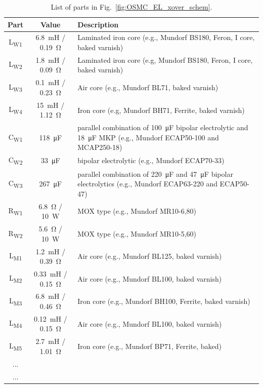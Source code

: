\documentclass[12pt,a4paper]{article}
\providecommand{\figr}[1]{Fig.~\ref{fig:#1}}
\providecommand{\tablabel}[1]{\label{tab:#1}}
\providecommand{\inductor}[1]{L\textsubscript{#1}}
\providecommand{\capacitor}[1]{C\textsubscript{#1}}
\providecommand{\resistor}[1]{R\textsubscript{#1}}
\begin{document}
\begin{table}[tb]

\centering
\caption{List of parts in \figr{OSMC_EL_xover_schem}.}
\tablabel{tab:OSMC_EL_xover_parts}
\begin{tabular}{ccp{}} 
\toprule
Part & Value & Description\\ 
\midrule 

\inductor{W1}	& \SI{6.8}{mH} / \SI{0.19}{\ohm}	& Laminated iron core (e.g., Mundorf BS180, Feron, I core, baked varnish)\\
\inductor{W2}	& \SI{1.8}{mH} / \SI{0.09}{\ohm}	& Laminated iron core (e.g, Mundorf BS180, Feron, I core, baked varnish)\\
\inductor{W3}	& \SI{0.1}{mH} / \SI{0.23}{\ohm}	& Air core (e.g., Mundorf BL71, baked varnish)\\
\inductor{W4}	& \SI{15}{mH}  / \SI{1.12}{\ohm}	& Iron core (e.g, Mundorf BH71, Ferrite, baked varnish)\\
\capacitor{W1}	& \SI{118}{\micro F}			& parallel combination of \SI{100}{\micro F} bipolar electrolytic and \SI{18}{\micro F} MKP (e.g., Mundorf ECAP50-100 and MCAP250-18)\\
\capacitor{W2}	& \SI{33}{\micro F}			& bipolar electrolytic (e.g., Mundorf ECAP70-33)\\
\capacitor{W3}	& \SI{267}{\micro F}			& parallel combination of \SI{220}{\micro F} and \SI{47}{\micro F} bipolar electrolytics (e.g., Mundorf ECAP63-220 and ECAP50-47)\\
\resistor{W1}	& \SI{6.8}{\ohm} / \SI{10}{W}		& MOX type (e.g., Mundorf MR10-6,80)\\
\resistor{W2}	& \SI{5.6}{\ohm} / \SI{10}{W}		& MOX type (e.g., Mundorf MR10-5,60)\\

\midrule

\inductor{M1}	& \SI{1.2}{mH} / \SI{0.39}{\ohm}	& Air core (e.g., Mundorf BL125, baked varnish)\\
\inductor{M2}	& \SI{0.33}{mH} / \SI{0.15}{\ohm}	& Air core (e.g., Mundorf BL100, baked varnish)\\
\inductor{M3}	& \SI{6.8}{mH} / \SI{0.46}{\ohm}	& Iron core (e.g., Mundorf BH100, Ferrite, baked varnish)\\
\inductor{M4}	& \SI{0.12}{mH} / \SI{0.15}{\ohm}	& Air core (e.g., Mundorf BL100, baked varnish)\\
\inductor{M5}	& \SI{2.7}{mH} / \SI{1.01}{\ohm}	& Iron core (e.g., Mundorf BP71, Ferrite, baked)\\
...\\
\midrule
...\\
\bottomrule
\end{tabular}
\end{table}
\end{document}
